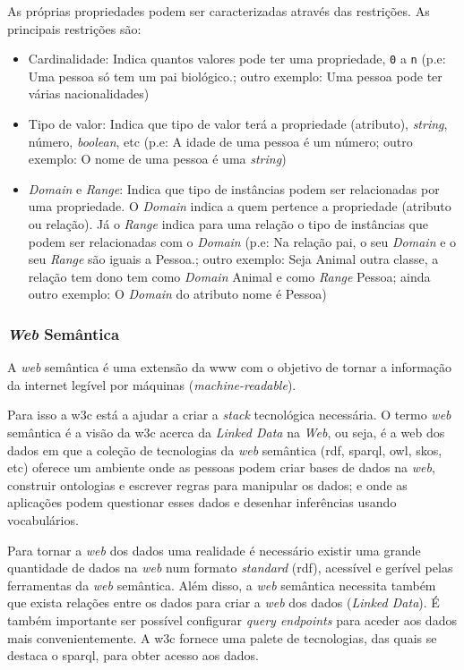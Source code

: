 As próprias propriedades podem ser caracterizadas através das restrições. As principais restrições são:
\begin{itemize}
    \item Cardinalidade: Indica quantos valores pode ter uma propriedade, \texttt{0} a \texttt{n} (p.e: Uma pessoa só tem um pai biológico.; outro exemplo: Uma pessoa pode ter várias nacionalidades)
    \item Tipo de valor: Indica que tipo de valor terá a propriedade (atributo), \textit{string}, número, \textit{boolean}, etc (p.e: A idade de uma pessoa é um número; outro exemplo: O nome de uma pessoa é uma \textit{string})
    \item \textit{Domain} e \textit{Range}: Indica que tipo de instâncias podem ser relacionadas por uma propriedade. O \textit{Domain} indica a quem pertence a propriedade (atributo ou relação). Já o \textit{Range} indica para uma relação o tipo de instâncias que podem ser relacionadas com o \textit{Domain} (p.e: Na relação pai, o seu \textit{Domain} e o seu \textit{Range} são iguais a Pessoa.; outro exemplo: Seja Animal outra classe, a relação tem dono tem como \textit{Domain} Animal e como \textit{Range} Pessoa; ainda outro exemplo: O \textit{Domain} do atributo nome é Pessoa)
\end{itemize}

\subsubsection{\textit{Web} Semântica}

A \textit{web} semântica é uma extensão da \acrshort{www} com o objetivo de tornar a informação da internet legível por máquinas (\textit{machine-readable}).

Para isso a \acrfull{w3c} está a ajudar a criar a \textit{stack} tecnológica necessária. O termo \textit{web} semântica é a visão da \acrshort{w3c} acerca da \textit{Linked Data} na \textit{Web}, ou seja, é a web dos dados em que a coleção de tecnologias da \textit{web} semântica (\acrshort{rdf}, \acrshort{sparql}, \acrshort{owl}, \acrshort{skos}, etc) oferece um ambiente onde as pessoas podem criar bases de dados na \textit{web}, construir ontologias e escrever regras para manipular os dados; e onde as aplicações podem questionar esses dados e desenhar inferências usando vocabulários.

Para tornar a \textit{web} dos dados uma realidade é necessário existir uma grande quantidade de dados na \textit{web} num formato \textit{standard} (\acrshort{rdf}), acessível e gerível pelas ferramentas da \textit{web} semântica. Além disso, a \textit{web} semântica necessita também que exista relações entre os dados para criar a \textit{web} dos dados (\textit{Linked Data}). É também importante ser possível configurar \textit{query endpoints} para aceder aos dados mais convenientemente. A \acrshort{w3c} fornece uma palete de tecnologias, das quais se destaca o \acrshort{sparql}, para obter acesso aos dados.

